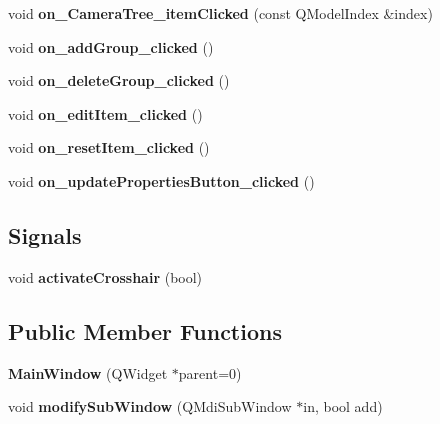 \begin{DoxyCompactItemize}
\item 
\hypertarget{class_main_window_aa9d6157cfea2122c950ea596cf4abd35}{void {\bfseries on\-\_\-\-Camera\-Tree\-\_\-item\-Clicked} (const Q\-Model\-Index \&index)}\label{class_main_window_aa9d6157cfea2122c950ea596cf4abd35}

\item 
\hypertarget{class_main_window_aa4af8cc82ae6505307b30d61255cc2a7}{void {\bfseries on\-\_\-add\-Group\-\_\-clicked} ()}\label{class_main_window_aa4af8cc82ae6505307b30d61255cc2a7}

\item 
\hypertarget{class_main_window_a9a9ac40bb316d617bb36c66e4c7f1dfa}{void {\bfseries on\-\_\-delete\-Group\-\_\-clicked} ()}\label{class_main_window_a9a9ac40bb316d617bb36c66e4c7f1dfa}

\item 
\hypertarget{class_main_window_a5dda7eed84b6bb0548482a24eba61dba}{void {\bfseries on\-\_\-edit\-Item\-\_\-clicked} ()}\label{class_main_window_a5dda7eed84b6bb0548482a24eba61dba}

\item 
\hypertarget{class_main_window_aeb1e5eeb783ea45feed5bdcf999050d0}{void {\bfseries on\-\_\-reset\-Item\-\_\-clicked} ()}\label{class_main_window_aeb1e5eeb783ea45feed5bdcf999050d0}

\item 
\hypertarget{class_main_window_a9ea249395f6f811c96f1d8114caff1dd}{void {\bfseries on\-\_\-update\-Properties\-Button\-\_\-clicked} ()}\label{class_main_window_a9ea249395f6f811c96f1d8114caff1dd}

\end{DoxyCompactItemize}
\subsection*{Signals}
\begin{DoxyCompactItemize}
\item 
\hypertarget{class_main_window_a8aca5460ce992afb3fcba398cc387466}{void {\bfseries activate\-Crosshair} (bool)}\label{class_main_window_a8aca5460ce992afb3fcba398cc387466}

\end{DoxyCompactItemize}
\subsection*{Public Member Functions}
\begin{DoxyCompactItemize}
\item 
\hypertarget{class_main_window_a8b244be8b7b7db1b08de2a2acb9409db}{{\bfseries Main\-Window} (Q\-Widget $\ast$parent=0)}\label{class_main_window_a8b244be8b7b7db1b08de2a2acb9409db}

\item 
\hypertarget{class_main_window_aa1aedeaf20f2f0b571a7bd655e3e819e}{void {\bfseries modify\-Sub\-Window} (Q\-Mdi\-Sub\-Window $\ast$in, bool add)}\label{class_main_window_aa1aedeaf20f2f0b571a7bd655e3e819e}

\end{DoxyCompactItemize}



